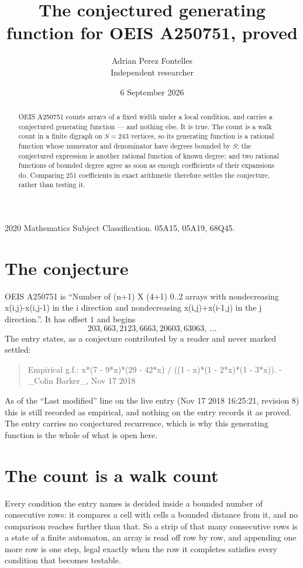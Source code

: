 \documentclass[11pt,a4paper]{article}
\title{The conjectured generating function for OEIS A250751, proved}
\author{Adrian Perez Fontelles\\ \small Independent researcher}
\date{6 September 2026}
\theoremstyle{plain}
\theoremstyle{definition}
\begin{document}
\maketitle

\begin{abstract}
OEIS A250751 counts arrays of a fixed width under a local condition, and carries a conjectured
generating function --- and nothing else. It is true. The count is a walk count in a finite
digraph on $S=243$ vertices, so its generating function is a rational function whose numerator
and denominator have degrees bounded by $S$; the conjectured expression is another rational
function of known degree; and two rational functions of bounded degree agree as soon as enough
coefficients of their expansions do. Comparing $251$ coefficients in exact arithmetic
therefore settles the conjecture, rather than testing it.
\end{abstract}

\noindent\small 2020 Mathematics Subject Classification. 05A15, 05A19, 68Q45.\normalsize

\section{The conjecture}

OEIS A250751 is ``Number of (n+1) X (4+1) 0..2 arrays with nondecreasing x(i,j)-x(i,j-1) in the i direction and nondecreasing x(i,j)+x(i-1,j) in the j direction.''. It has offset $1$ and begins
\[
203, 663, 2123, 6663, 20603, 63063,\ \dots
\]
The entry states, as a conjecture contributed by a reader and never marked settled:
\begin{quote}
Empirical g.f.: x*(7 - 9*x)*(29 - 42*x) / ((1 - x)*(1 - 2*x)*(1 - 3*x)). - \_Colin Barker\_, Nov 17 2018
\end{quote}
As of the ``Last modified'' line on the live entry (Nov 17 2018 16:25:21, revision 8) this is still
recorded as empirical, and nothing on the entry records it as proved. The entry carries no
conjectured recurrence, which is why this generating function is the whole of what is open
here.

\section{The count is a walk count}

Every condition the entry names is decided inside a bounded number of consecutive rows: it
compares a cell with cells a bounded distance from it, and no comparison reaches further than
that. So a strip of that many consecutive rows is a state of a finite automaton, an array is
read off row by row, and appending one more row is one step, legal exactly when the row it
completes satisfies every condition that becomes testable.
\end{document}
